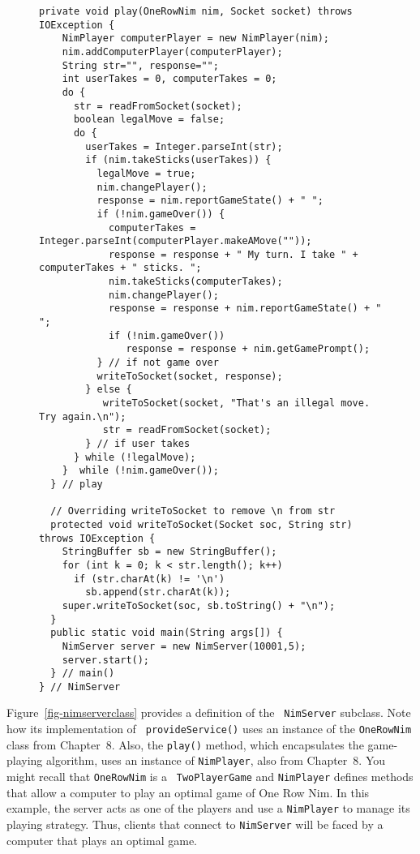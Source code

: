 {\begin{figure}[h!]
\begin{jjjlisting}[29pc]
\begin{lstlisting}[basicstyle=\scriptsize]
  private void play(OneRowNim nim, Socket socket) throws IOException {
    NimPlayer computerPlayer = new NimPlayer(nim);
    nim.addComputerPlayer(computerPlayer);
    String str="", response="";
    int userTakes = 0, computerTakes = 0;
    do {     
      str = readFromSocket(socket);
      boolean legalMove = false;
      do {
        userTakes = Integer.parseInt(str);
        if (nim.takeSticks(userTakes)) {
          legalMove = true;
          nim.changePlayer();
          response = nim.reportGameState() + " ";
          if (!nim.gameOver()) {
            computerTakes = Integer.parseInt(computerPlayer.makeAMove(""));    
            response = response + " My turn. I take " + computerTakes + " sticks. ";
            nim.takeSticks(computerTakes);
            nim.changePlayer();
            response = response + nim.reportGameState() + " ";
            if (!nim.gameOver())
               response = response + nim.getGamePrompt();
          } // if not game over
          writeToSocket(socket, response);
        } else {
           writeToSocket(socket, "That's an illegal move. Try again.\n");
           str = readFromSocket(socket);
        } // if user takes
      } while (!legalMove);
    }  while (!nim.gameOver());
  } // play

  // Overriding writeToSocket to remove \n from str
  protected void writeToSocket(Socket soc, String str) throws IOException {
    StringBuffer sb = new StringBuffer();
    for (int k = 0; k < str.length(); k++)
      if (str.charAt(k) != '\n')
        sb.append(str.charAt(k));
    super.writeToSocket(soc, sb.toString() + "\n");
  }
  public static void main(String args[]) {
    NimServer server = new NimServer(10001,5);
    server.start();
  } // main()
} // NimServer
\end{lstlisting}
\end{jjjlisting}
\end{figure}

Figure~\ref{fig-nimserverclass} provides a definition of the {\tt
NimServer} subclass. Note how its implementation of {\tt
provideService()} uses an instance of the {\tt OneRowNim} class from
Chapter~8. Also, the {\tt play()} method, which encapsulates the
game-playing algorithm, uses an instance of {\tt NimPlayer}, also from
Chapter~8. You might recall that {\tt OneRowNim} is a {\tt
TwoPlayerGame} and {\tt NimPlayer} defines methods that allow a
computer to play an optimal game of One Row Nim.  In this example, the
server acts as one of the players and use a {\tt NimPlayer} to manage
its playing strategy.  Thus, clients that connect to {\tt NimServer}
will be faced by a computer that plays an optimal game.

}
